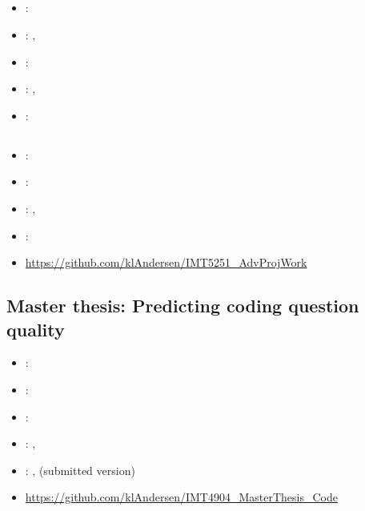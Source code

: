 \label{sec:section6}

\subsection[Global Software Development]{}
\label{sec:glob_soft_dev}
\begin{itemize} 
	\item {}: 
	\item {}: , 
	\item {}: 
	\item {}: , 
	\item {}: 
\end{itemize} 

\subsection[Advanced Project Work]{}
\label{sec:adv_proj_work}
\begin{itemize} 
	\item {}: 
	\item {}: 
	\item {}: , 
	\item {}: 
	\item {} \url{https://github.com/klAndersen/IMT5251_AdvProjWork}
\end{itemize} 

\subsection{Master thesis: Predicting coding question quality}
\label{sec:master_thesis}
\begin{itemize} 
	\item {}: 
	\item {}: 
	\item {}: 
	\item {}: , 
	\item {}: ,  (submitted version)
	\item {} \url{https://github.com/klAndersen/IMT4904_MasterThesis_Code}
\end{itemize} 